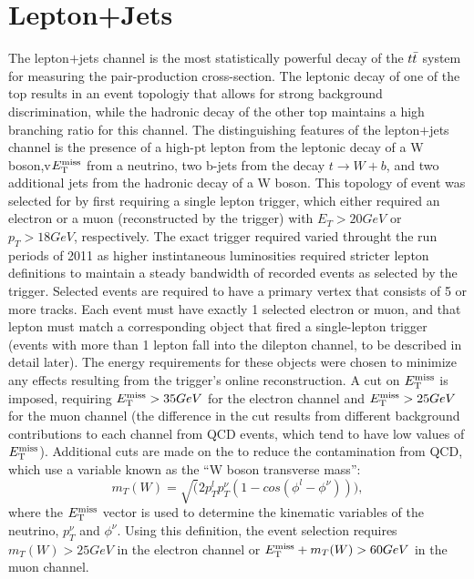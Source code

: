 
\section{Lepton+Jets}

The lepton$+$jets channel is the most statistically powerful decay of the $t\bar{t}$ system for measuring the pair-production cross-section.
The leptonic decay of one of the top results in an event topologiy that allows for strong background discrimination, while the hadronic decay of the other top maintains a high branching ratio for this channel.
The distinguishing features of the lepton$+$jets channel is the presence of a high-pt lepton from the leptonic decay of a W boson,v$E_{\mathrm{T}}^{\mathrm{miss}}$ from a neutrino, two b-jets from the decay $t \rightarrow W+b$, and two additional jets from the hadronic decay of a W boson.
This topology of event was selected for by first requiring a single lepton trigger, which either required an electron or a muon (reconstructed by the trigger) with $E_{T} > 20 GeV$ or $p_{T} > 18 GeV$, respectively.
The exact trigger required varied throught the run periods of 2011 as higher instintaneous luminosities required stricter lepton definitions to maintain a steady bandwidth of recorded events as selected by the trigger.
Selected events are required to have a primary vertex that consists of 5 or more tracks.
Each event must have exactly 1 selected electron or muon, and that lepton must match a corresponding object that fired a single-lepton trigger (events with more than 1 lepton fall into the dilepton channel, to be described in detail later).
The energy requirements for these objects were chosen to minimize any effects resulting from the trigger's online reconstruction.
A cut on $E_{\mathrm{T}}^{\mathrm{miss}}$ is imposed, requiring $E_{\mathrm{T}}^{\mathrm{miss}} > 35 GeV$ for the electron channel and $E_{\mathrm{T}}^{\mathrm{miss}} > 25 GeV$ for the muon channel (the difference in the cut results from different background contributions to each channel from QCD events, which tend to have low values of $E_{\mathrm{T}}^{\mathrm{miss}}$).
Additional cuts are made on the to reduce the contamination from QCD, which use a variable known as the ``W boson transverse mass'':
\begin{equation}
  m_{T}(W) = \sqrt(2 p_{T}^{l} p_{T}^{\nu} (1 - cos( \phi^{l} - \phi^{\nu}))),
\end{equation} 
where the $E_{\mathrm{T}}^{\mathrm{miss}}$ vector is used to determine the kinematic variables of the neutrino, $p_{T}^{\nu}$ and $\phi^{\nu}$.
Using this definition, the event selection requires $m_{T}(W) > 25 GeV$ in the electron channel or $E_{\mathrm{T}}^{\mathrm{miss}} + m_{T}(W) > 60 GeV$ in the muon channel.




